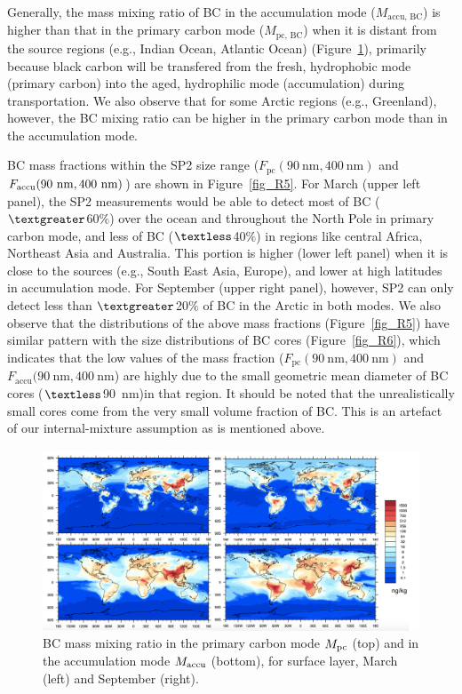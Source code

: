 \documentclass[12pt, fullpage]{uiucthesis2009}
\begin{document}
	
	Generally, the mass mixing ratio of BC in the accumulation mode ($M_{\text{accu, BC}}$) is higher than that in the primary carbon mode ($M_{\text{pc, BC}}$) when it is distant from the source regions (e.g., Indian Ocean, Atlantic Ocean) (Figure~\ref{fig_R4}), primarily because black carbon will be transfered from the fresh, hydrophobic mode (primary carbon) into the aged, hydrophilic mode (accumulation) during transportation. We also observe that for some Arctic regions (e.g., Greenland), however, the BC mixing ratio can be higher in the primary carbon mode than in the accumulation mode.
	
	BC mass fractions within the SP2 size range ($F_{\text{pc}}(90~\text{nm}, 400~\text{nm})$ and
	$F_{\text{accu}}(90~\rm nm, 400~\rm nm)$) are shown in Figure~\ref{fig_R5}. For March
	(upper left panel), the SP2 measurements would be able to detect most of BC ($\textgreater$60$\%$) over the ocean and throughout the North Pole in primary carbon mode, and less of BC ($\textless$40$\%$) in regions like central Africa, Northeast Asia and Australia. This portion is higher (lower left panel) when it is close to the sources (e.g., South East Asia, Europe), and lower at high latitudes in accumulation mode. For September
	(upper right panel), however, SP2 can only detect less than $\textgreater$20$\%$ of BC in the Arctic in both modes. We also observe that the distributions of the above mass fractions (Figure~\ref{fig_R5}) have similar pattern with the size distributions of BC cores (Figure~\ref{fig_R6}), which indicates that the low values of the mass fraction ($F_{\text{pc}}(90~\text{nm}, 400~\text{nm})$ and $F_{\text{accu}}(90~\text{nm}, 400~\text{nm}$) are highly due to the small geometric mean diameter of BC cores ($\textless$90~nm)in that region. It should be noted that the unrealistically small cores come from the very small volume fraction of BC. This is an artefact of our internal-mixture assumption as is mentioned above. 
	\begin{figure}[h] 
		\begin{center}
			\includegraphics[width = 1\textwidth]{Rplot01}
			\caption[BC mass mixing ratio in the primary carbon mode $M_{\rm pc}$ (top) and in the accumulation mode $M_{\rm accu}$ (bottom), for surface layer, March (left) and September (right).]{\label{fig_R4}BC mass mixing ratio in the primary carbon mode $M_{\rm pc}$ (top) and in the accumulation mode $M_{\rm accu}$ (bottom), for surface layer, March (left) and September (right).}
		\end{center}
	\end{figure}
	
\end{document}

